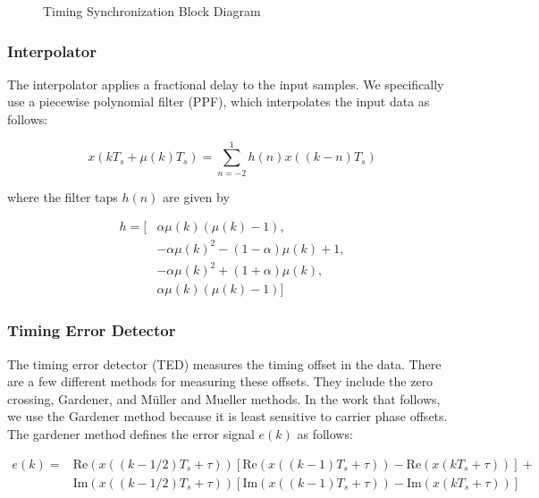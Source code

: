\documentclass[conference,onecolumn]{IEEEtran}
\begin{document}
\begin{figure}[H]
	\centerline{}
	\caption{Timing Synchronization Block Diagram}
	\label{fig::timing_synchronization}
\end{figure}

\subsubsection{Interpolator}

\noindent The interpolator applies a fractional delay to the input samples. We specifically use a piecewise polynomial filter (PPF), which interpolates the input data as follows:

\begin{equation}
	x(kT_s + \mu(k)T_s) = \sum_{n=-2}^{1}{h(n)x((k-n)T_s)}
\end{equation}

\noindent where the filter taps $h(n)$ are given by

\begin{equation}
\begin{split}
	h = [&\alpha\mu(k)(\mu(k) - 1), \\
	&-\alpha\mu(k)^2 - (1-\alpha)\mu(k) + 1,\\
	&-\alpha\mu(k)^2 + (1+\alpha)\mu(k),\\
	&\alpha\mu(k)(\mu(k) - 1)]
\end{split}
\end{equation}

\subsubsection{Timing Error Detector}

\noindent The timing error detector (TED) measures the timing offset in the data. There are a few different methods for measuring these offsets. They include the zero crossing, Gardener, and  M\"{u}ller and Mueller methods. In the work that follows, we use the Gardener method because it is least sensitive to carrier phase offsets. The gardener method defines the error signal $e(k)$ as follows:

\begin{equation}
\begin{split}
	e(k) =& \text{Re}(x((k-1/2)T_s+\tau))\left[\text{Re}(x((k-1)T_s + \tau)) - \text{Re}(x(kT_s + \tau))\right] + \\
	&\text{Im}(x((k-1/2)T_s+\tau))\left[\text{Im}(x((k-1)T_s+\tau)) -\text{Im}(x(kT_s+\tau))\right]
\end{split}
\end{equation}
\end{document}
